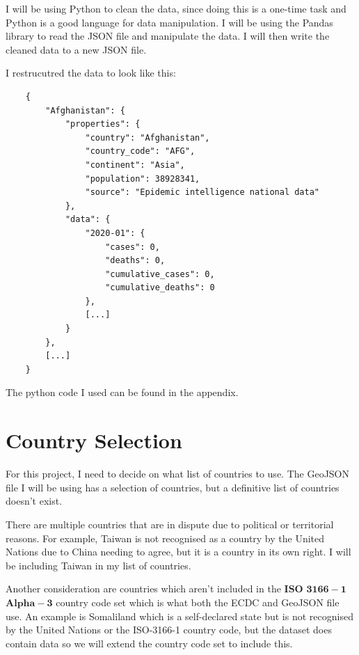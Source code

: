 \documentclass{report}
\begin{document}
I will be using Python to clean the data, since doing this is a one-time task and Python is a good language for data manipulation. I will be using the Pandas library to read the JSON file and manipulate the data. I will then write the cleaned data to a new JSON file.

I restrucutred the data to look like this:
\begin{center}
    \begin{lstlisting}
    {
        "Afghanistan": {
            "properties": {
                "country": "Afghanistan",
                "country_code": "AFG",
                "continent": "Asia",
                "population": 38928341,
                "source": "Epidemic intelligence national data"
            },
            "data": {
                "2020-01": {
                    "cases": 0,
                    "deaths": 0,
                    "cumulative_cases": 0,
                    "cumulative_deaths": 0
                },
                [...]
            }
        },
        [...]
    }
    \end{lstlisting}
\end{center}
The python code I used can be found in the appendix.

\section{Country Selection}
For this project, I need to decide on what list of countries to use. The GeoJSON file I will be using has a selection of countries, but a definitive list of countries doesn't exist.

There are multiple countries that are in dispute due to political or territorial reasons. For example, Taiwan is not recognised as a country by the United Nations due to China needing to agree, but it is a country in its own right. I will be including Taiwan in my list of countries.

Another consideration are countries which aren't included in the $\mathbf{ISO}$ $\mathbf{3166-1}$ $\mathbf{Alpha-3}$ country code set which is what both the ECDC and GeoJSON file use. An example is Somaliland which is a self-declared state but is not recognised by the United Nations or the ISO-3166-1 country code, but the dataset does contain data so we will extend the country code set to include this.
\end{document}

